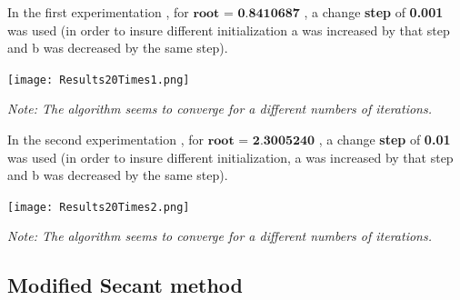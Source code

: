 \documentclass{article}
\begin{document}
In the first experimentation , for $\textbf{root = 0.8410687}$ , a change \textbf{step} of \textbf{0.001} was used (in order to insure different initialization a was increased by that step and b was decreased by the same step).
\vspace{0.2cm}
\begin{tcolorbox}[colback=gray!10, colframe=gray!80, width=\textwidth, sharp corners]
    \centering 
    \texttt{[image: Results20Times1.png]} 


    \vspace{0.2cm} 
    
    
    \small\textit{Note: The algorithm seems to converge for a different numbers of iterations.}
\end{tcolorbox}
\vspace{0.5cm}

In the second experimentation , for $\textbf{root = 2.3005240}$ , a change \textbf{step} of \textbf{0.01} was used (in order to insure different initialization, a was increased by that step and b was decreased by the same step).
\vspace{0.2cm}
\begin{tcolorbox}[colback=gray!10, colframe=gray!80, width=\textwidth, sharp corners]
    \centering 
    \texttt{[image: Results20Times2.png]} 


    \vspace{0.1cm} 
    
    
    \small\textit{Note: The algorithm seems to converge for a different numbers of iterations.}
\end{tcolorbox}





\subsection{Modified Secant method}
\subsubsection{}
\end{document}
